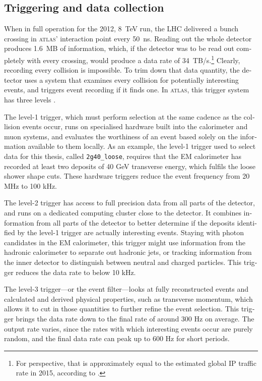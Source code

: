 \begin{english}
\subsection{Triggering and data collection}
When in full operation for the 2012, 8~TeV run, the LHC delivered a bunch crossing in \textsc{atlas}' interaction point every 50~ns. Reading out the whole detector produces 1.6~MB of information, which, if the detector was to be read out completely with every crossing, would produce a data rate of 34~TB/s.\footnote{For perspective, that is approximately equal to the estimated global IP traffic rate in 2015, according to \cite{wolframip}.} Clearly, recording every collision is impossible. To trim down that data quantity, the detector uses a system that examines every collision for potentially interesting events, and triggers event recording if it finds one. In \textsc{atlas}, this trigger system has three levels \cite{detectorpaper}.

The level-1 trigger, which must perform selection at the same cadence as the collision events occur, runs on specialised hardware built into the calorimeter and muon systems, and evaluates the worthiness of an event based solely on the information available to them locally. As an example, the level-1 trigger used to select data for this thesis, called \texttt{2g40\_loose}, requires that the EM calorimeter has recorded at least two deposits of 40 GeV transverse energy, which fulfils the loose shower shape cuts. These hardware triggers reduce the event frequency from 20 MHz to 100 kHz.

The level-2 trigger has access to full precision data from all parts of the detector, and runs on a dedicated computing cluster close to the detector. It combines information from all parts of the detector to better determine if the deposits identified by the level-1 trigger are actually interesting events. Staying with photon candidates in the EM calorimeter, this trigger might use information from the hadronic calorimeter to separate out hadronic jets, or tracking information from the inner detector to distinguish between neutral and charged particles. This trigger reduces the data rate to below 10 kHz.

The level-3 trigger---or the event filter---looks at fully reconstructed events and calculated and derived physical properties, such as transverse momentum, which allows it to cut in those quantities to further refine the event selection. This trigger brings the data rate down to the final rate of around 300 Hz on average. The output rate varies, since the rates with which interesting events occur are purely random, and the final data rate can peak up to 600 Hz for short periods.


\end{english}
